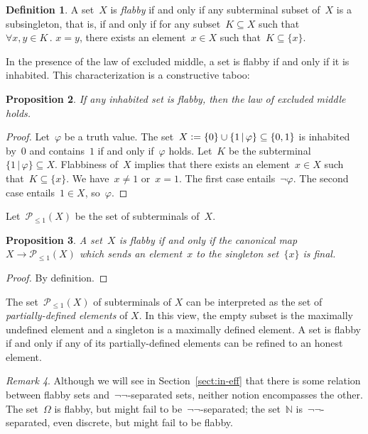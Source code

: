 \documentclass[oneside]{amsart}
\theoremstyle{definition}
\newtheorem{defn}{Definition}[section]
\theoremstyle{plain}
\newtheorem{prop}[defn]{Proposition}
\theoremstyle{remark}
\newtheorem{rem}[defn]{Remark}
\newcommand{\NN}{\mathbb{N}}
\renewcommand{\P}{\mathcal{P}}
\newcommand{\defeq}{\vcentcolon=}
\renewcommand{\_}{\mathpunct{.}\,}
\begin{document}
\begin{defn}A set~$X$ is \emph{flabby} if and only if any subterminal subset
of~$X$ is a subsingleton, that is, if and only if for any subset~$K \subseteq
X$ such that~$\forall x,y \in K\_ x = y$, there exists an element~$x \in X$
such that~$K \subseteq \{ x \}$.
\end{defn}

In the presence of the law of excluded middle, a set is flabby if and only if
it is inhabited. This characterization is a constructive taboo:

\begin{prop}\label{prop:taboo}
If any inhabited set is flabby, then the law of excluded middle
holds.
\end{prop}

\begin{proof}Let~$\varphi$ be a truth value. The set~$X \defeq \{ 0 \}
\cup \{ 1 \,|\, \varphi \} \subseteq \{ 0,1 \}$ is inhabited by~$0$ and
contains~$1$ if and only if~$\varphi$ holds. Let~$K$ be the subterminal~$\{ 1 \,|\, \varphi
\} \subseteq X$. Flabbiness of~$X$ implies that there exists an element~$x \in
X$ such that~$K \subseteq \{x\}$. We have~$x \neq 1$ or~$x = 1$. The first case
entails~$\neg\varphi$. The second case entails~$1 \in X$, so~$\varphi$.
\end{proof}

Let~$\P_{\leq 1}(X)$ be the set of subterminals of~$X$.

\begin{prop}A set~$X$ is flabby if and only if the canonical map~$X \to
\P_{\leq 1}(X)$ which sends an element~$x$ to the singleton set~$\{x\}$ is
final.
\end{prop}

\begin{proof}By definition.\end{proof}

The set~$\P_{\leq 1}(X)$ of subterminals of $X$ can be interpreted as the set
of \emph{partially-defined elements} of $X$. In this view, the empty subset is
the maximally undefined element and a singleton is a maximally defined element.
A set is flabby if and only if any of its partially-defined elements can be
refined to an honest element.

\begin{rem}Although we will see in Section~\ref{sect:in-eff} that there is some
relation between flabby sets and~$\neg\neg$-separated sets, neither notion
encompasses the other. The set~$\Omega$ is flabby, but might fail to
be~$\neg\neg$-separated; the set~$\NN$ is~$\neg\neg$-separated, even discrete,
but might fail to be flabby.
\end{rem}
\end{document}
